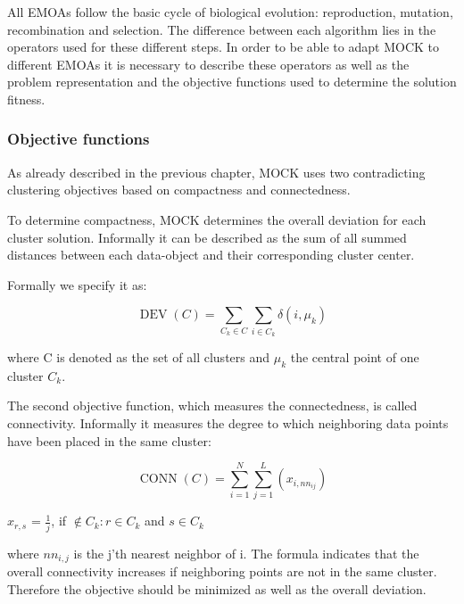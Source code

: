\documentclass[parskip=half,DIV=14]{scrartcl}\usepackage[]{graphicx}\usepackage[]{color}
\begin{document}
All EMOAs follow the basic cycle of biological evolution: reproduction, mutation, recombination and selection. The difference between each algorithm lies in the operators used for these different steps. In order to be able to adapt MOCK to different EMOAs it is necessary to describe these operators as well as the problem representation and the objective functions used to determine the solution fitness.
\subsubsection{Objective functions}

As already described in the previous chapter, MOCK uses two contradicting clustering objectives based on compactness and connectedness.

To determine compactness, MOCK determines the overall deviation for each cluster solution. Informally it can be described as the sum of all summed distances between each data-object and their corresponding cluster center.

Formally we specify it as:

\begin{displaymath}
\operatorname{DEV}(C) = \sum_{C_k \in C} \sum_{i \in C_k} \delta(i,\mu_k)
\end{displaymath}

where C is denoted as the set of all clusters and $\mu_k$ the central point of one cluster $C_k$.

The second objective function, which measures the connectedness, is called connectivity. Informally it measures the degree to which neighboring data points have been placed in the same cluster\cite{handl}:


\begin{displaymath}
\operatorname{CONN}(C) = \sum_{i=1}^N \sum_{j=1}^L (x_{i,nn_{ij}})
\end{displaymath}

\begin{center}
$x_{r,s}$ = $\frac{1}{j}$, if $\notin C_k:r\in C_k$ and $s\in C_k$
\end{center}

where $nn_{i,j}$ is the j'th nearest neighbor of i. The formula indicates that the overall connectivity increases if neighboring points are not in the same cluster. Therefore the objective should be minimized as well as the overall deviation.
\end{document}
